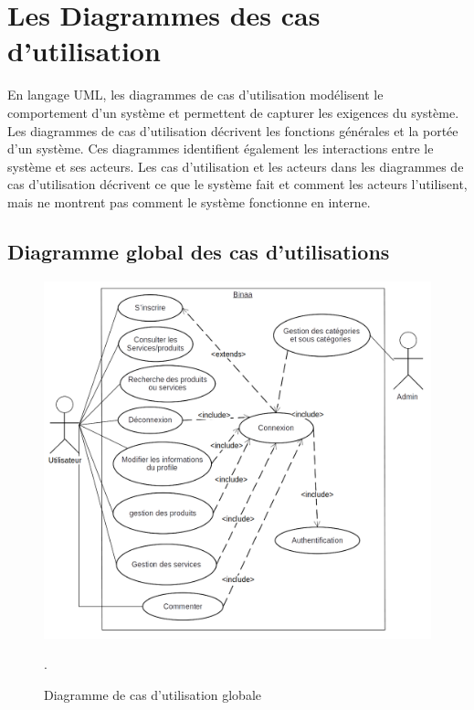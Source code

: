 \section{Les Diagrammes des cas d'utilisation }
\par En langage UML, les diagrammes de cas d'utilisation modélisent le
comportement d'un système et permettent de capturer les exigences du système.
Les diagrammes de cas d'utilisation décrivent les fonctions générales et la
portée d'un système. Ces diagrammes identifient également les interactions
entre le système et ses acteurs. Les cas d'utilisation et les acteurs dans les
diagrammes de cas d'utilisation décrivent ce que le système fait et comment les
acteurs l'utilisent, mais ne montrent pas comment le système fonctionne en
interne.\cite{ref4}
\subsection{Diagramme global des cas d'utilisations }
\begin{figure}[H]
\centering
\includegraphics[scale=0.35]{images/use case/use case global.png}
\caption{Diagramme de cas d’utilisation globale}.
\label{fig:my_label}
\end{figure}
